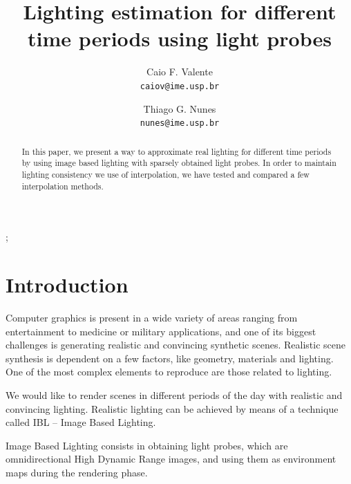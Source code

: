 \documentclass[conference]{acmsiggraph}
\title{Lighting estimation for different time periods using light probes}
\author{
  Caio F. Valente\\
  \texttt{caiov@ime.usp.br}
  \and
  Thiago G. Nunes\\
  \texttt{nunes@ime.usp.br}
}
\begin{document}

\maketitle

\begin{abstract}
	In this paper, we present a way to approximate real lighting for different time periods by using image based lighting with sparsely obtained light probes. In order to maintain 
	lighting consistency we use of interpolation, we have tested and compared a few interpolation methods.
\end{abstract}

\begin{CRcatlist}
  ;
\end{CRcatlist}

\keywordlist


\TOGlinkslist


\copyrightspace

\section{Introduction}

Computer graphics is present in a wide variety of areas ranging from entertainment to medicine or military applications, and one of its biggest challenges is generating realistic and 
convincing synthetic scenes. Realistic scene synthesis is dependent on a few factors, like geometry, materials and lighting. One of the most complex elements to reproduce are those 
related to lighting.

We would like to render scenes in different periods of the day with realistic and convincing lighting. Realistic lighting can be achieved by means of a technique called IBL – Image 
Based Lighting. 

Image Based Lighting consists in obtaining light probes, which are omnidirectional High Dynamic Range images, and using them as environment maps during the rendering phase.
\end{document}
